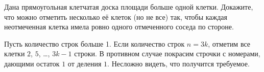 Дана прямоугольная клетчатая доска площади больше одной клетки.
Докажите, что можно отметить несколько её клеток (но не все) так, чтобы каждая
неотмеченная клетка имела ровно одного отмеченного соседа по стороне.

\solution
Пусть количество строк больше 1.
Если количество строк $n = 3 k$, отметим все клетки
$2$, $5$, \ldots, $3 k - 1$ строки.
В противном случае покрасим строчки с номерами, дающими остаток $1$ от деления
$1$.
Несложно видеть, что получится требуемое.


